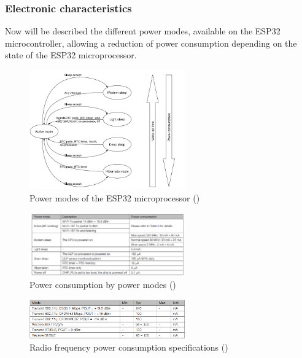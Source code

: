 \newpage
\subsubsection{Electronic characteristics}
\label{subsubsec:hardware/electronic_characteristics} 

Now will be described the different power modes, available on the ESP32 microcontroller, allowing a reduction of power consumption depending on the state of the ESP32 microprocessor.

\begin{figure}[H]
    \centering
    \includegraphics[width=0.6\textwidth]{images/EE_PowerModes.PNG}
    \caption{Power modes of the ESP32 microprocessor (\cite{esp32techrefmanual})}
    \label{fig:power_modes}
\end{figure}

\begin{figure}[H]
    \centering
    \includegraphics[width=0.6\textwidth]{images/EE_PowerConsumption.PNG}
    \caption{Power consumption by power modes (\cite{esp32datasheet})}
    \label{fig:power_consumption}
\end{figure}

\begin{figure}[H]
    \centering
    \includegraphics[width=0.6\textwidth]{images/EE_PowerConsumption2.PNG}
    \caption{Radio frequency power consumption specifications  (\cite{esp32datasheet})}
    \label{fig:power_consumption2}
\end{figure}

